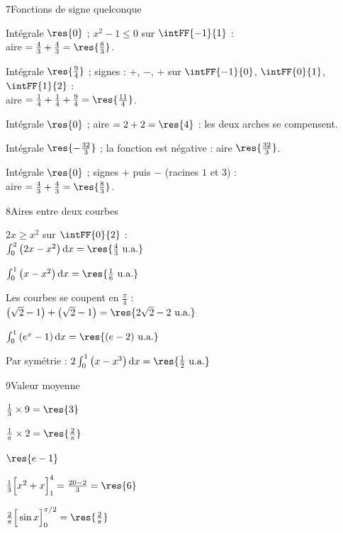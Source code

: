 \begin{deuxcolonnes}
\begin{corrige}{7}{Fonctions de signe quelconque}
\begin{questions}
  \item Intégrale $\res{0}$ ; $x^{2}-1\leq0$ sur $\intFF{-1}{1}$ :\\ aire $=\frac43+\frac43=\res{\frac83}$.
  \item Intégrale $\res{\frac94}$ ; signes : $+$, $-$, $+$ sur $\intFF{-1}{0}$, $\intFF{0}{1}$, $\intFF{1}{2}$ :\\
    aire $=\frac14+\frac14+\frac94=\res{\frac{11}{4}}$.
  \item Intégrale $\res{0}$ ; aire $=2+2=\res{4}$ : les deux arches se compensent.
  \item Intégrale $\res{-\frac{32}{3}}$ ; la fonction est négative : aire $\res{\frac{32}{3}}$.
  \item Intégrale $\res{0}$ ; signes $+$ puis $-$ (racines $1$ et $3$) :\\ aire $=\frac43+\frac43=\res{\frac83}$.
\end{questions}
\end{corrige}

\begin{corrige}{8}{Aires entre deux courbes}
\begin{questions}
  \item $2x\geq x^{2}$ sur $\intFF{0}{2}$ :\\ $\int_0^2\left(2x-x^{2}\right)\mathrm{d}x=\res{\frac43\text{ u.a.}}$
  \item $\int_0^1\left(x-x^{2}\right)\mathrm{d}x=\res{\frac16\text{ u.a.}}$
  \item Les courbes se coupent en $\frac{\pi}{4}$ :\\ $\left(\sqrt2-1\right)+\left(\sqrt2-1\right)=\res{2\sqrt2-2\text{ u.a.}}$
  \item $\int_0^1\left(e^{x}-1\right)\mathrm{d}x=\res{(e-2)\text{ u.a.}}$
  \item Par symétrie : $2\int_0^1\left(x-x^{3}\right)\mathrm{d}x=\res{\frac12\text{ u.a.}}$
\end{questions}
\end{corrige}

\begin{corrige}{9}{Valeur moyenne}
\begin{questions}
  \item $\frac13\times9=\res{3}$
  \item $\frac{1}{\pi}\times2=\res{\frac{2}{\pi}}$
  \item $\res{e-1}$
  \item $\frac13\Big[x^{2}+x\Big]_1^4=\frac{20-2}{3}=\res{6}$
  \item $\frac{2}{\pi}\Big[\sin x\Big]_0^{\pi/2}=\res{\frac{2}{\pi}}$
\end{questions}
\end{corrige}


\end{deuxcolonnes}
